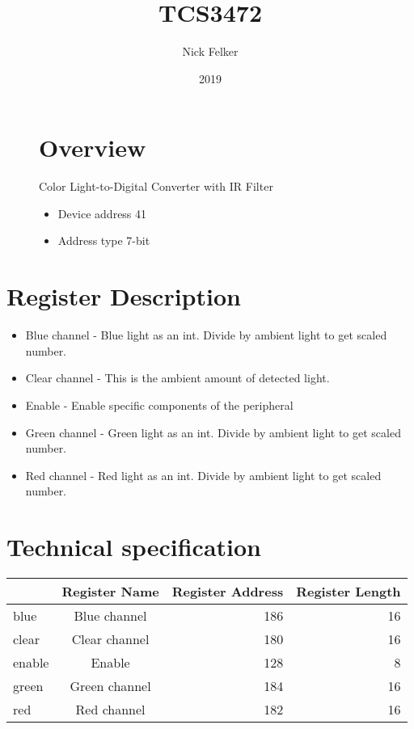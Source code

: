 \documentclass[a4paper,12pt,oneside,pdflatex,italian,final,twocolumn]{article}
\title{ TCS3472 }
\author{ Nick Felker }
\date{ 2019 }
\begin{document}
\pagestyle{fancy}



\onecolumn


\begin{figure}
\begin{minipage}{0.47\textwidth}

\section{Overview}
    Color Light-to-Digital Converter with IR Filter
    \begin{itemize}
        \item Device address 41
        \item Address type 7-bit
    \end{itemize}


\end{minipage}
\hfill

\end{figure}


\section{Register Description}
\begin{itemize}
\item Blue channel - Blue light as an int. Divide by ambient light to get scaled number.
\item Clear channel - This is the ambient amount of detected light.
\item Enable - Enable specific components of the peripheral
\item Green channel - Green light as an int. Divide by ambient light to get scaled number.
\item Red channel - Red light as an int. Divide by ambient light to get scaled number.
\end{itemize}

\section{Technical specification}
\centering
\begin{tabular}{lcrr}
\toprule
 & Register Name & Register Address & Register Length \\
\midrule
blue & Blue channel & 186 & 16 \\
clear & Clear channel & 180 & 16 \\
enable & Enable & 128 & 8 \\
green & Green channel & 184 & 16 \\
red & Red channel & 182 & 16 \\
\bottomrule
\end{tabular}
\end{document}
